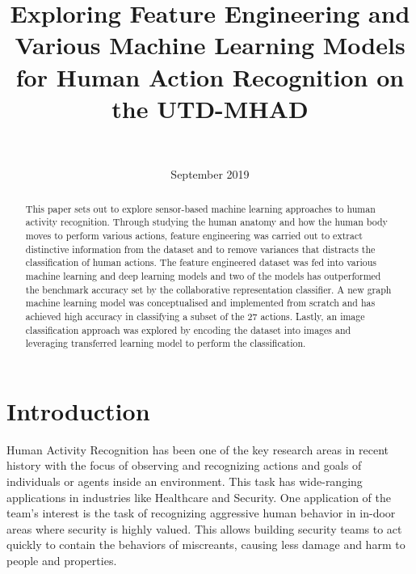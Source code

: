 \documentclass[conference]{IEEEtran}
\begin{document}
\title{Exploring Feature Engineering and Various Machine
Learning Models for Human Action Recognition on the
UTD-MHAD}

\author{ \\
}
\maketitle

\date{September 2019}

\begin{abstract}
This paper sets out to explore sensor-based machine learning approaches to human activity recognition. Through studying the human anatomy and how the human body moves to perform various actions, feature engineering was carried out to extract distinctive information from the dataset and to remove variances that distracts the classification of human actions. The feature engineered dataset was fed into various machine learning and deep learning models and two of the models has outperformed the benchmark accuracy set by the collaborative representation classifier. A new graph machine learning model was conceptualised and implemented from scratch and has achieved high accuracy in classifying a subset of the 27 actions. Lastly, an image classification approach was explored by encoding the dataset into images and leveraging transferred learning model to perform the classification.  
\end{abstract}

\section{Introduction}
Human Activity Recognition has been one of the key research areas in recent history with the focus of observing and recognizing actions and goals of individuals or agents inside an environment. This task has wide-ranging applications in industries like Healthcare and Security. One application of the team's interest is the task of recognizing aggressive human behavior in in-door areas where security is highly valued. This allows building security teams to act quickly to contain the behaviors of miscreants, causing less damage and harm to people and properties.
\end{document}

